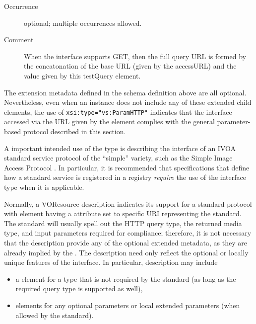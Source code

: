 \documentclass[11pt,a4paper]{ivoa}
\begin{document}
\begin{generated}
\begin{bigdescription}
\begin{description}
\item[Occurrence] optional; multiple occurrences allowed.
\item[Comment] 
                       When the interface supports GET, then the full 
                       query URL is formed by the concatonation of the 
                       base URL (given by the accessURL) and the value 
                       given by this testQuery element.  
                    

\end{description}


\end{bigdescription}\endgroup

\endgroup
\end{generated}


The extension metadata defined in the schema definition above are all
optional.  Nevertheless, even when an 
instance does not include any of these extended child elements, the
use of \verb|xsi:type="vs:ParamHTTP"| indicates that the interface
accessed via the URL given by the 
element complies with the general parameter-based protocol described
in this section.  






A important intended use of the  type is
describing the interface of an IVOA standard service protocol 
of the ``simple'' variety, such as the Simple Image Access Protocol
\citep{2015ivoa.spec.1223D}.  In particular, it is recommended that
specifications that define how a standard service is registered in a
registry \emph{require} the use of the 
interface type when it is applicable.



Normally, a VOResource
description indicates its support for a standard protocol with
 element having a
 attribute set to specific URI representing the
standard.  The standard will usually spell out the HTTP query type,
the returned media type, and input parameters required for compliance;
therefore, it is not necessary that the 
description provide any of the optional extended metadata, as they are
already implied by the .  The description need
only reflect the optional or locally unique features of the
interface.  In particular, description may include


\begin{itemize}
\item a  element for a type that is not
  required by the standard (as long as the required query type is
  supported as well),

\item {} elements for any optional parameters
       or local extended parameters (when allowed by the standard).
\end{itemize}
\end{document}
